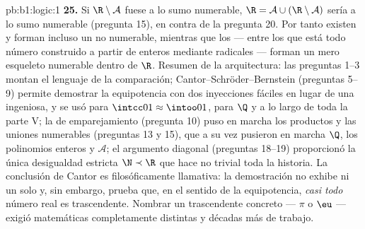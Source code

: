 \begin{solution}{pb:b1:logic:1}
\textbf{25.} Si $\R \setminus \mathcal{A}$ fuese a lo sumo numerable,
$\R = \mathcal{A} \cup (\R \setminus \mathcal{A})$ sería a lo sumo
numerable (pregunta 15), en contra de la pregunta 20. Por tanto existen
 y forman incluso un  no numerable,
mientras que los  --- entre los que está todo
número construido a partir de enteros mediante radicales --- forman un
mero esqueleto numerable dentro de $\R$. Resumen de la arquitectura:
las preguntas 1--3 montan el lenguaje de la comparación;
Cantor--Schröder--Bernstein (preguntas 5--9) permite demostrar la
equipotencia con dos inyecciones fáciles en lugar de una 
ingeniosa, y se usó para $\intcc01 \approx \intoo01$, para $\Q$ y a lo
largo de toda la parte V; la  de emparejamiento (pregunta 10)
puso en marcha los productos y las uniones numerables (preguntas 13
y 15), que a su vez pusieron en marcha $\Q$, los polinomios enteros y
$\mathcal{A}$; el argumento diagonal (preguntas 18--19) proporcionó la
única desigualdad estricta $\N \prec \R$ que hace no trivial toda la
historia. La conclusión de Cantor es filosóficamente llamativa: la
demostración no exhibe ni un solo  y, sin embargo,
prueba que, en el sentido de la equipotencia, \emph{casi todo} número
real es trascendente. Nombrar un trascendente concreto --- $\pi$ o
$\eu$ --- exigió matemáticas completamente distintas y décadas más de
trabajo.
\end{solution}
